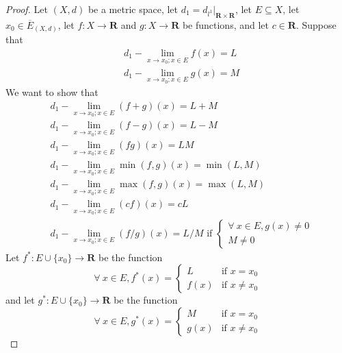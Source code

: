 \begin{proof}
    Let \((X, d)\) be a metric space, let \(d_1 = d_{l^1}|_{\mathbf{R} \times \mathbf{R}}\), let \(E \subseteq X\), let \(x_0 \in \overline{E}_{(X, d)}\), let \(f : X \to \mathbf{R}\) and \(g : X \to \mathbf{R}\) be functions, and let \(c \in \mathbf{R}\).
    Suppose that
    \begin{align*}
         & d_1 - \lim_{x \to x_0 ; x \in E} f(x) = L \\
         & d_1 - \lim_{x \to x_0 ; x \in E} g(x) = M
    \end{align*}
    We want to show that
    \begin{align*}
         & d_1 - \lim_{x \to x_0 ; x \in E} (f + g)(x) = L + M                                        \\
         & d_1 - \lim_{x \to x_0 ; x \in E} (f - g)(x) = L - M                                        \\
         & d_1 - \lim_{x \to x_0 ; x \in E} (fg)(x) = LM                                              \\
         & d_1 - \lim_{x \to x_0 ; x \in E} \min(f, g)(x) = \min(L, M)                                \\
         & d_1 - \lim_{x \to x_0 ; x \in E} \max(f, g)(x) = \max(L, M)                                \\
         & d_1 - \lim_{x \to x_0 ; x \in E} (cf)(x) = cL                                              \\
         & d_1 - \lim_{x \to x_0 ; x \in E} (f / g)(x) = L / M \text{ if } \begin{cases}
            \forall\ x \in E, g(x) \neq 0 \\
            M \neq 0
        \end{cases}
    \end{align*}
    Let \(f^* : E \cup \{x_0\} \to \mathbf{R}\) be the function
    \[
        \forall\ x \in E, f^*(x) = \begin{cases}
            L    & \text{if } x = x_0    \\
            f(x) & \text{if } x \neq x_0
        \end{cases}
    \]
    and let \(g^* : E \cup \{x_0\} \to \mathbf{R}\) be the function
    \[
        \forall\ x \in E, g^*(x) = \begin{cases}
            M    & \text{if } x = x_0    \\
            g(x) & \text{if } x \neq x_0
        \end{cases}
\]
\end{proof}
